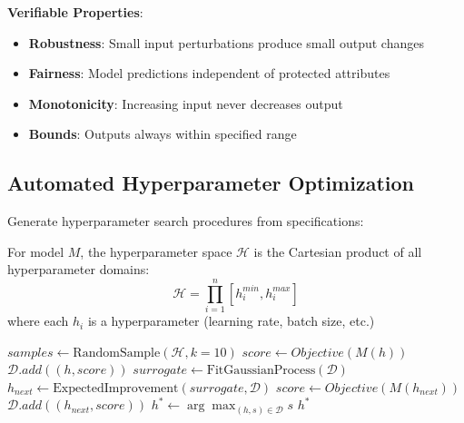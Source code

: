 \textbf{Verifiable Properties}:
\begin{itemize}
    \item \textbf{Robustness}: Small input perturbations produce small output changes
    \item \textbf{Fairness}: Model predictions independent of protected attributes
    \item \textbf{Monotonicity}: Increasing input never decreases output
    \item \textbf{Bounds}: Outputs always within specified range
\end{itemize}

\subsection{Automated Hyperparameter Optimization}

Generate hyperparameter search procedures from specifications:

\begin{definition}
    For model $M$, the hyperparameter space $\mathcal{H}$ is the Cartesian product of all hyperparameter domains:
    \begin{equation}
        \mathcal{H} = \prod_{i=1}^{n} [h_i^{min}, h_i^{max}]
    \end{equation}
    where each $h_i$ is a hyperparameter (learning rate, batch size, etc.)
\end{definition}

\begin{algorithm}
\caption{Bayesian Optimization for Hyperparameters}
\begin{algorithmic}[1]
    \State $samples \gets \text{RandomSample}(\mathcal{H}, k=10)$ 
        \State $score \gets Objective(M(h))$ 
        \State $\mathcal{D}.add((h, score))$ 
    \EndFor
        \State $surrogate \gets \text{FitGaussianProcess}(\mathcal{D})$
        \State $h_{next} \gets \text{ExpectedImprovement}(surrogate, \mathcal{D})$
        \State $score \gets Objective(M(h_{next}))$
        \State $\mathcal{D}.add((h_{next}, score))$
    \EndWhile
    \State $h^* \gets \arg\max_{(h,s) \in \mathcal{D}} s$
    \State \Return $h^*$
\EndProcedure
\end{algorithmic}
\end{algorithm}

